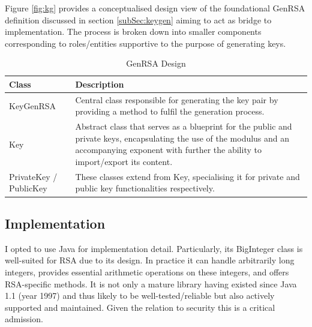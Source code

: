 \documentclass[]{final_report}
\theoremstyle{definition}
\begin{document}
Figure \ref{fig:kg} provides a conceptualised design view of the foundational GenRSA definition discussed in section  \ref{subSec:keygen} aiming to act as bridge to implementation. The process is broken down into smaller components corresponding to roles/entities supportive to the purpose of generating keys. 


\begin{table}[H]
    \centering
    \caption{GenRSA Design}
    \label{tab:actors_description}
    \begin{tabular}{|l|p{10cm}|}
    \hline
    \textbf{Class} & \textbf{Description} \\
    \hline
    KeyGenRSA & Central class responsible for generating the key pair by providing a method to fulfil the generation process. \\
    \hline
    Key & Abstract class that serves as a blueprint for the public and private keys, encapsulating the use of the modulus and an accompanying exponent with further the ability to import/export its content. \\
    \hline
    PrivateKey / PublicKey & These classes extend from Key, specialising it for private and public key functionalities respectively. \\
    \hline
    \end{tabular}
\end{table}

\subsection{Implementation}
I opted to use Java for implementation detail. Particularly, its BigInteger class is well-suited for RSA due to its design. In practice it can handle arbitrarily long integers, provides essential arithmetic operations on these integers, and offers RSA-specific methods. It is not only a mature library having existed since Java 1.1 (year 1997) and thus likely to be well-tested/reliable but also actively supported and maintained. Given the relation to security this is a critical admission. 
\end{document}
